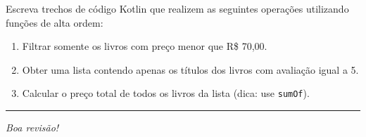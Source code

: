 \documentclass[12pt,a4paper]{article}
\newcommand{\resposta}[1]{
\noindent
\framebox[\textwidth]{
\begin{minipage}{0.98\textwidth}
\vspace*{#1}\null
\end{minipage}
}
}
\begin{document}
Escreva trechos de código Kotlin que realizem as seguintes operações utilizando funções de alta ordem:

\begin{enumerate}[label=\alph*)]
    \item Filtrar somente os livros com preço menor que R\$ 70,00.
    \item Obter uma lista contendo apenas os títulos dos livros com avaliação igual a 5.
    \item Calcular o preço total de todos os livros da lista (dica: use \texttt{sumOf}).
\end{enumerate}

\vspace{0.3cm}
\resposta{7cm}

\vspace{1cm}
\hrule
\vspace{0.3cm}
\begin{center}
    \textit{Boa revisão!}
\end{center}
\end{document}
